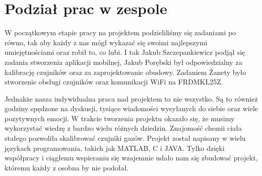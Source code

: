 \documentclass[12pt,a4paper]{article}
\begin{document}
\section{Podział prac w zespole}

W początkowym etapie pracy na projektem podzieliliśmy się zadaniami po równo, tak aby każdy z nas mógł wykazać się swoimi najlepszymi umiejętnościami oraz robił to, co lubi. I tak Jakub Szczepankiewicz podjął się zadania stworzenia aplikacji mobilnej, Jakub Porębski był odpowiedzialny za kalibrację czujników oraz za zaprojektowanie obudowy. Zadaniem Żanety było stworzenie obsługi czujników oraz komunikacji WiFi na FRDMKL25Z.

Jednakże nasza indywidualna praca nad projektem to nie wszystko. Są to również godziny spędzone na dyskusji, tysiące wiadomości wysyłanych do siebie oraz wiele pozytywnych emocji. W trakcie tworzenia projektu okazało się, że musimy wykorzystać wiedzę z bardzo wielu różnych dziedzin. Znajomość chemii ciała stałego pozwoliła skalibrować czujniki gazów. Projekt został napisany w wielu językach programowania, takich jak \mbox{MATLAB}, C i JAVA. Tylko dzięki współpracy i ciągłemu wspieraniu się wzajemnie udało nam się zbudować projekt, któremu każdy z osobna by nie podołał.






\end{document}
